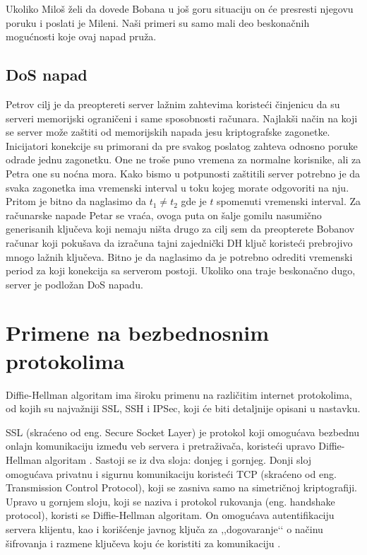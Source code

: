 \documentclass[a4paper]{article}
\begin{document}
Ukoliko Miloš želi da dovede Bobana u još goru situaciju on će presresti njegovu poruku i poslati je Mileni. Naši primeri su samo mali deo beskonačnih mogućnosti koje ovaj napad pruža.


\subsection{DoS napad}
Petrov cilj je da preoptereti server lažnim zahtevima koristeći činjenicu da su serveri memorijski ograničeni i same sposobnosti računara. Najlakši način na koji se server može zaštiti od memorijskih napada jesu kriptografske zagonetke. Inicijatori konekcije su primorani da pre svakog poslatog zahteva odnosno poruke odrade jednu zagonetku. One ne troše puno vremena za normalne korisnike, ali za Petra one su noćna mora. Kako bismo u potpunosti zaštitili server potrebno je da svaka zagonetka ima vremenski interval u toku kojeg morate odgovoriti na nju. Pritom je bitno da naglasimo da $t_1 \neq t_2$ gde je $t$ spomenuti vremenski interval. Za računarske napade Petar se vraća, ovoga puta on šalje gomilu nasumično generisanih ključeva koji nemaju ništa drugo za cilj sem da preopterete Bobanov računar koji pokušava da izračuna tajni zajednički DH ključ koristeći prebrojivo mnogo lažnih ključeva. Bitno je da naglasimo da je potrebno odrediti vremenski period za koji konekcija sa serverom postoji. Ukoliko ona traje beskonačno dugo, server je podložan DoS napadu.

\section{Primene na bezbednosnim protokolima}
\label{sec:primene}

Diffie-Hellman algoritam ima široku primenu na različitim internet protokolima, od kojih su najvažniji SSL, SSH i IPSec, koji će biti detaljnije opisani u nastavku.

SSL (skraćeno od eng. Secure Socket Layer) je protokol koji omogućava bezbednu onlajn komunikaciju između veb servera i pretraživača, koristeći upravo Diffie-Hellman algoritam \cite{use}. Sastoji se iz dva sloja: donjeg i gornjeg. Donji sloj omogućava privatnu i sigurnu komunikaciju koristeći TCP (skraćeno od eng. Transmission Control Protocol), koji se zasniva samo na simetričnoj kriptografiji. Upravo u gornjem sloju, koji se naziva i protokol rukovanja (eng. handshake protocol), koristi se Diffie-Hellman algoritam. On omogućava autentifikaciju servera klijentu, kao i korišćenje javnog ključa za ,,dogovaranje‘‘ o načinu šifrovanja i razmene ključeva koju će koristiti za komunikaciju \cite{use}. 
\end{document}
